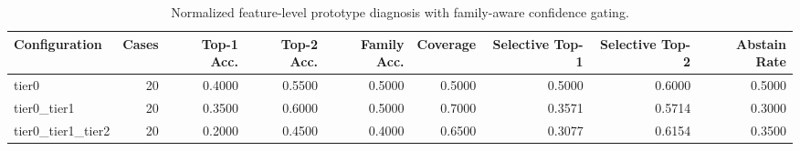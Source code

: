 \begin{table}[t]
\centering
\caption{Normalized feature-level prototype diagnosis with family-aware confidence gating.}
\label{tab:dice_stressor_hierarchical_diagnosis}
\footnotesize
\begin{tabular}{lrrrrrrrr}
\toprule
Configuration & Cases & Top-1 Acc. & Top-2 Acc. & Family Acc. & Coverage & Selective Top-1 & Selective Top-2 & Abstain Rate \\
\midrule
tier0 & 20 & 0.4000 & 0.5500 & 0.5000 & 0.5000 & 0.5000 & 0.6000 & 0.5000 \\
tier0_tier1 & 20 & 0.3500 & 0.6000 & 0.5000 & 0.7000 & 0.3571 & 0.5714 & 0.3000 \\
tier0_tier1_tier2 & 20 & 0.2000 & 0.4500 & 0.4000 & 0.6500 & 0.3077 & 0.6154 & 0.3500 \\
\bottomrule
\end{tabular}

\end{table}
